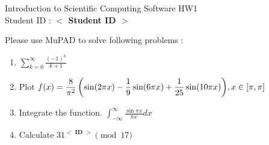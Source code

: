 \documentclass[12pt,a4paper]{article}
\newcommand{\placeholder}[1]{\textbf{$<$ #1 $>$}}
\newcommand{\idnumber}{\placeholder{Student ID}}
\newcommand{\moodleid}{\placeholder{ID}}
\begin{document}
\begin{flushleft}Introduction to Scientific Computing Software HW1
\\Student ID : \idnumber{}\end{flushleft}

Please use MuPAD to solve following problems : 
\begin{enumerate}
\item 
$\displaystyle{\sum^\infty_{k=0}\frac{(-1)^{k}}{k+1}}$

\item Plot
$\displaystyle{f(x)= \frac{8}{\pi^2} \left( \sin (2\pi x)-{1 \over 9} \sin (6\pi x)+{1 \over 25} \sin (10\pi x)\right) },x\in[\pi,\pi]$

\item Integrate the function. $\displaystyle{\int^\infty_{-\infty}\frac{\sin \pi x}{\pi x}dx}$

\item Calculate $31^{\moodleid}\pmod{17}$

\end{enumerate}
\end{document}
